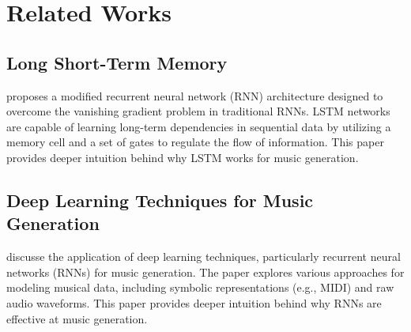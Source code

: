 \section*{Related Works}

\subsection*{Long Short-Term Memory}
\cite{lstm} proposes a modified recurrent neural network (RNN) architecture designed to overcome the vanishing gradient problem in traditional RNNs. LSTM networks are capable of learning long-term dependencies in sequential data by utilizing a memory cell and a set of gates to regulate the flow of information. This paper provides deeper intuition behind why LSTM works for music generation.

\subsection*{Deep Learning Techniques for Music Generation} 
\cite{briot} discusse the application of deep learning techniques, particularly recurrent neural networks (RNNs) for music generation. The paper explores various approaches for modeling musical data, including symbolic representations (e.g., MIDI) and raw audio waveforms. This paper provides deeper intuition behind why RNNs are effective at music generation.
